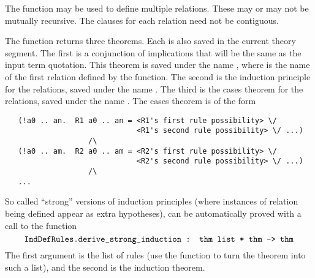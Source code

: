The  function may be used to define multiple relations.
These may or may not be mutually recursive.  The clauses for each
relation need not be contiguous.

The function returns three theorems.  Each is also saved in the
current theory segment.  The first is a conjunction of implications
that will be the same as the input term quotation.  This theorem is
saved under the name , where  is the name of the
first relation defined by the function.  The second is the induction
principle for the relations, saved under the name .  The
third is the cases theorem for the relations, saved under the name
.  The cases theorem is of the form
\begin{verbatim}
   (!a0 .. an.  R1 a0 .. an = <R1's first rule possibility> \/
                              <R1's second rule possibility> \/ ...)
                   /\
   (!a0 .. am.  R2 a0 .. am = <R2's first rule possibility> \/
                              <R2's second rule possibility> \/ ...)
                   /\
   ...
\end{verbatim}

So called ``strong'' versions of induction principles (where instances
of relation being defined appear as extra hypotheses), can be
automatically proved with a call to the function \[
\ml{IndDefRules.derive\_strong\_induction : thm list * thm -> thm}
\]
The first argument is the list of rules (use the \ml{CONJUNCTS}
function to turn the  theorem into such a list), and
the second is the induction theorem.




